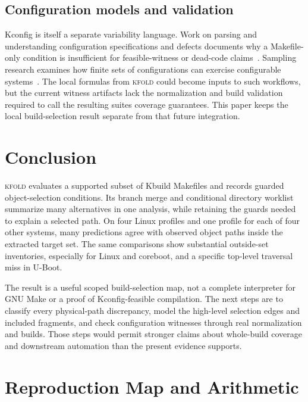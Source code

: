 \documentclass[acmsmall,screen,review]{acmart}
\newcommand{\tool}{\textsc{kfold}\xspace}
\begin{document}
\subsection{Configuration models and validation}
Kconfig is itself a separate variability language. Work on parsing and understanding configuration specifications and defects documents why a Makefile-only condition is insufficient for feasible-witness or dead-code claims~\cite{dietrich2012variability,nadi2014where,tartler2011dead}. Sampling research examines how finite sets of configurations can exercise configurable systems~\cite{medeiros2016comparison}. The local formulas from \tool could become inputs to such workflows, but the current witness artifacts lack the normalization and build validation required to call the resulting suites coverage guarantees. This paper keeps the local build-selection result separate from that future integration.

\section{Conclusion}
\label{sec:conclusion}

\tool evaluates a supported subset of Kbuild Makefiles and records guarded object-selection conditions. Its branch merge and conditional directory worklist summarize many alternatives in one analysis, while retaining the guards needed to explain a selected path. On four Linux profiles and one profile for each of four other systems, many predictions agree with observed object paths inside the extracted target set. The same comparisons show substantial outside-set inventories, especially for Linux and coreboot, and a specific top-level traversal miss in U-Boot.

The result is a useful scoped build-selection map, not a complete interpreter for GNU Make or a proof of Kconfig-feasible compilation. The next steps are to classify every physical-path discrepancy, model the high-level selection edges and included fragments, and check configuration witnesses through real normalization and builds. Those steps would permit stronger claims about whole-build coverage and downstream automation than the present evidence supports.




\appendix
\section{Reproduction Map and Arithmetic}
\label{app:reproduction}
\end{document}

